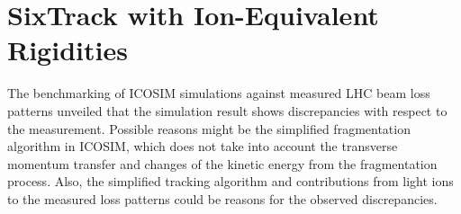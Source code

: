 \chapter{SixTrack with Ion-Equivalent Rigidities }\label{chap:stier}
%
%
%


The benchmarking of ICOSIM simulations against measured LHC beam loss patterns unveiled that the simulation result shows discrepancies with respect to the measurement. Possible reasons might be the simplified fragmentation algorithm in ICOSIM, which does not take into account the transverse momentum transfer and changes of the kinetic energy from the fragmentation process. Also, the simplified tracking algorithm and contributions from light ions to the measured loss patterns could be reasons for the observed discrepancies.  


